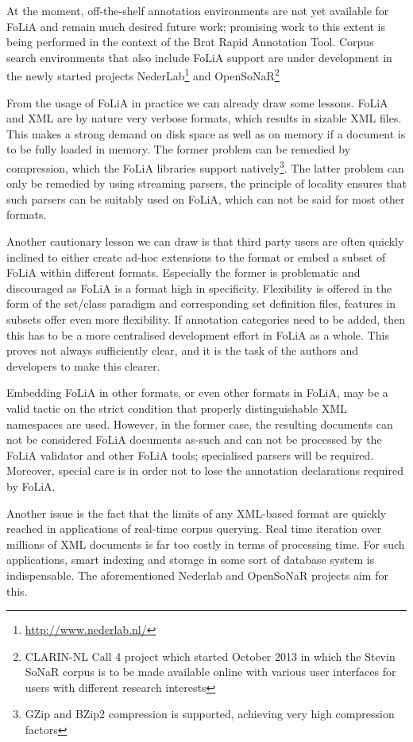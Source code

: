\documentclass[a4paper,10pt,twoside]{article}
\begin{document}
At the moment, off-the-shelf annotation environments are not yet available for
FoLiA and remain much desired future work; promising work to this extent is
being performed in the context of the Brat
Rapid Annotation Tool. Corpus search environments that also include
FoLiA support are under development in the newly started projects
NederLab\footnote{\url{http://www.nederlab.nl/}} and OpenSoNaR\footnote{CLARIN-NL
Call 4 project which started October 2013 in which the Stevin SoNaR corpus is to
be made available online with various user interfaces for users with different
research interests}

From the usage of FoLiA in practice we can already draw some lessons. FoLiA and
XML are by nature very verbose formats, which results in sizable XML files.
This makes a strong demand on disk space as well as on memory if a document is
to be fully loaded in memory. The former problem can be remedied by
compression, which the FoLiA libraries support natively\footnote{GZip and BZip2
compression is supported, achieving very high compression factors}. The latter
problem can only be remedied by using streaming parsers, the principle of
locality ensures that such parsers can be suitably used on FoLiA, which can not
be said for most other formats.

Another cautionary lesson we can draw is that third party users are often quickly
inclined to either create ad-hoc extensions to the format or embed a subset of
FoLiA within different formats. Especially the former is problematic and
discouraged as FoLiA is a format high in specificity. Flexibility is offered in the form of the
set/class paradigm and corresponding set definition files, features in subsets offer even
more flexibility. If annotation categories need to be added, then this has to
be a more centralised development effort in FoLiA as a whole. This proves not
always sufficiently clear, and it is the task of the authors and developers to
make this clearer.

Embedding FoLiA in other formats, or even other formats in FoLiA, may be a
valid tactic on the strict condition that properly distinguishable XML
namespaces are used. However, in the former case, the resulting documents can
not be considered FoLiA documents as-such and can not be processed by the FoLiA
validator and other FoLiA tools; specialised parsers will be required.
Moreover, special care is in order not to lose the annotation declarations
required by FoLiA. 

Another issue is the fact that the limits of any XML-based format are quickly
reached in applications of real-time corpus querying. Real time iteration over
millions of XML documents is far too costly in terms of processing time. For
such applications, smart indexing and storage in some sort of database system
is indispensable. The aforementioned Nederlab and OpenSoNaR projects aim for
this. 
\end{document}
